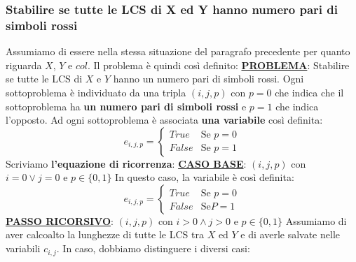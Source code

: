 \documentclass[12pt]{article}
\begin{document}
\subsubsection{Stabilire se tutte le LCS di X ed Y hanno numero pari di simboli rossi}
Assumiamo di essere nella stessa situazione del paragrafo precedente per quanto riguarda $X$, $Y$ e $col$.
Il problema è quindi così definito: \newline
\textbf{\underline{PROBLEMA}}: Stabilire se tutte le LCS di $X$ e $Y$ hanno un numero pari di simboli rossi. \newline
Ogni sottoproblema è individuato da una tripla $(i,j,p)$ con $p = 0$ che indica che il sottoproblema ha \textbf{un numero pari di simboli rossi}
e $p = 1$ che indica l'opposto. Ad ogni sottoproblema è associata \textbf{una variabile} così definita:
\begin{equation*}
    e_{i,j,p} = \begin{cases}
        True & \textrm{Se } p = 0 \\
        False & \textrm{Se } p = 1
    \end{cases}
\end{equation*}
Scriviamo \textbf{l'equazione di ricorrenza}: \newline
\textbf{\underline{CASO BASE}}: $(i,j,p)$ con $ i = 0 \vee j = 0$ e $p \in \{0,1\}$ \newline
In questo caso, la variabile è così definita:
\begin{equation*}
    e_{i,j,p} = \begin{cases}
        True & \textrm{Se } p = 0 \\
        False & \textrm{Se} P = 1
    \end{cases}
\end{equation*}
\textbf{\underline{PASSO RICORSIVO}}: $(i,j,p)$ con $i > 0 \land j > 0$ e $p \in \{0,1\}$ \newline
Assumiamo di aver calcoalto la lunghezze di tutte le LCS tra $X$ ed $Y$ e di averle salvate nelle variabili $c_{i,j}$.
In caso, dobbiamo distinguere i diversi casi:
\end{document}
